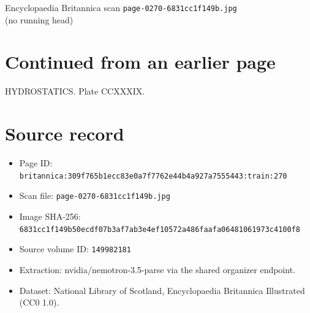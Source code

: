 \documentclass{article}
\begin{document}
\begin{center}
{\Large Encyclopaedia Britannica scan \texttt{page-0270-6831cc1f149b.jpg}}\\[0.5em]
(no running head)
\end{center}
\section*{Continued from an earlier page}
HYDROSTATICS. Plate CCXXXIX.

\section*{Source record}
\begin{itemize}
\item Page ID: \texttt{britannica:309f765b1ecc83e0a7f7762e44b4a927a7555443:train:270}
\item Scan file: \texttt{page-0270-6831cc1f149b.jpg}
\item Image SHA-256: \texttt{6831cc1f149b50ecdf07b3af7ab3e4ef10572a486faafa06481061973c4100f8}
\item Source volume ID: \texttt{149982181}
\item Extraction: nvidia/nemotron-3.5-parse via the shared organizer endpoint.
\item Dataset: National Library of Scotland, Encyclopaedia Britannica Illustrated (CC0 1.0).
\end{itemize}
\end{document}
